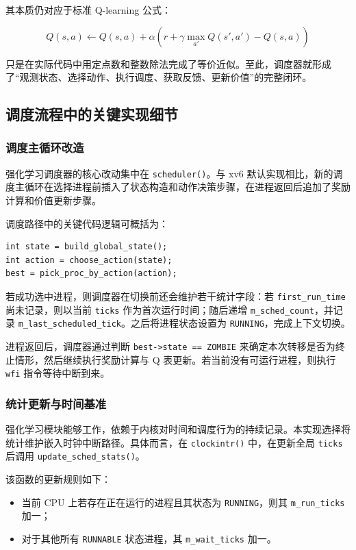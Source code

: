 其本质仍对应于标准 Q-learning 公式：

\begin{equation}
Q(s,a) \leftarrow Q(s,a) + \alpha \left( r + \gamma \max_{a'}Q(s',a') - Q(s,a) \right)
\end{equation}

只是在实际代码中用定点数和整数除法完成了等价近似。至此，调度器就形成了“观测状态、选择动作、执行调度、获取反馈、更新价值”的完整闭环。

\subsection{调度流程中的关键实现细节}

\subsubsection{调度主循环改造}

强化学习调度器的核心改动集中在 \texttt{scheduler()}。与 xv6 默认实现相比，新的调度主循环在选择进程前插入了状态构造和动作决策步骤，在进程返回后追加了奖励计算和价值更新步骤。

调度路径中的关键代码逻辑可概括为：

\begin{verbatim}
int state = build_global_state();
int action = choose_action(state);
best = pick_proc_by_action(action);
\end{verbatim}

若成功选中进程，则调度器在切换前还会维护若干统计字段：若 \texttt{first\_run\_time} 尚未记录，则以当前 \texttt{ticks} 作为首次运行时间；随后递增 \texttt{m\_sched\_count}，并记录 \texttt{m\_last\_scheduled\_tick}。之后将进程状态设置为 \texttt{RUNNING}，完成上下文切换。

进程返回后，调度器通过判断 \texttt{best->state == ZOMBIE} 来确定本次转移是否为终止情形，然后继续执行奖励计算与 Q 表更新。若当前没有可运行进程，则执行 \texttt{wfi} 指令等待中断到来。

\subsubsection{统计更新与时间基准}

强化学习模块能够工作，依赖于内核对时间和调度行为的持续记录。本实现选择将统计维护嵌入时钟中断路径。具体而言，在 \texttt{clockintr()} 中，在更新全局 \texttt{ticks} 后调用 \texttt{update\_sched\_stats()}。

该函数的更新规则如下：

\begin{itemize}
\item 当前 CPU 上若存在正在运行的进程且其状态为 \texttt{RUNNING}，则其 \texttt{m\_run\_ticks} 加一；
\item 对于其他所有 \texttt{RUNNABLE} 状态进程，其 \texttt{m\_wait\_ticks} 加一。
\end{itemize}

